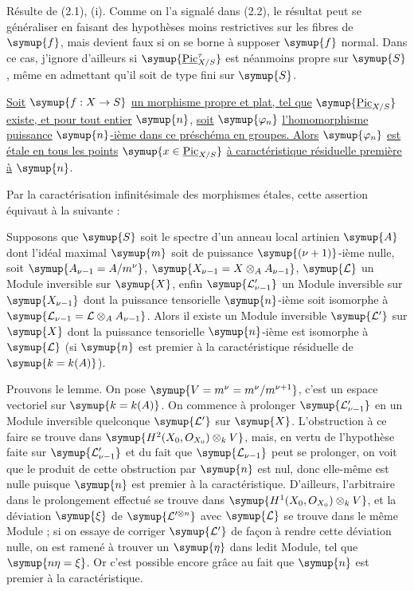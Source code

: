 Résulte de (2.1), (i). Comme on l'a signalé dans (2.2), le résultat peut se
généraliser en faisant des hypothèses moins restrictives sur les fibres de $\symup{f}$,
mais devient faux si on se borne à supposer $\symup{f}$ normal. Dans ce cas, j'ignore
d'ailleurs si $\symup{\underline{\operatorname{Pic}}_{X/S}^\tau}$ est néanmoins propre sur $\symup{S}$,
même en admettant qu'il soit de type fini sur $\symup{S}$.

 \uline{Soit} $\symup{f:X\to S}$ \uline{un morphisme propre et
plat, tel que} $\symup{\underline{\operatorname{Pic}}_{X/S}}$ \uline{existe, et pour tout entier} $\symup{n}$, \uline{soit}
$\symup{\varphi_n}$ \uline{l'homomorphisme puissance} $\symup{n}$\uline{-ième dans ce préschéma en groupes.
Alors} $\symup{\varphi_n}$ \uline{est étale en tous les points}
$\symup{x\in\underline{\operatorname{Pic}}_{X/S}}$ \uline{à
caractéristique résiduelle première à} $\symup{n}$.

Par la caractérisation infinitésimale des morphismes étales, cette assertion
équivaut à la suivante :

 Supposons que $\symup{S}$ soit le spectre d'un anneau local
artinien $\symup{A}$ dont l'idéal maximal $\symup{m}$ soit de puissance
$\symup{(\nu+1)}$-ième nulle, soit $\symup{A_{\nu-1}=A/m^\nu}$, $\symup{X_{\nu-1}=X\otimes_A A_{\nu-1}}$, $\symup{\mathcal L}$ un Module inversible sur $\symup{X}$, enfin $\symup{\mathcal L'_{\nu-1}}$ un
Module inversible sur $\symup{X_{\nu-1}}$ dont la puissance tensorielle $\symup{n}$-ième soit
isomorphe à $\symup{\mathcal L_{\nu-1}=\mathcal L\otimes_A A_{\nu-1}}$. Alors il existe un Module inversible $\symup{\mathcal L'}$ sur $\symup{X}$ dont la puissance
tensorielle $\symup{n}$-ième est isomorphe à $\symup{\mathcal L}$ (si $\symup{n}$ est premier à la
caractéristique résiduelle de $\symup{k=k(A)}$).

Prouvons le lemme. On pose $\symup{V=m^\nu=m^\nu/m^{\nu+1}}$, c'est un espace vectoriel sur $\symup{k=k(A)}$. On commence à prolonger
$\symup{\mathcal L'_{\nu-1}}$ en un Module inversible quelconque $\symup{\mathcal L'}$ sur $\symup{X}$.
L'obstruction à ce faire se trouve dans $\symup{H^2(X_0,O_{X_0})\otimes_k V}$, mais, en vertu de l'hypothèse faite sur $\symup{\mathcal L'_{\nu-1}}$ et du fait que
$\symup{\mathcal L_{\nu-1}}$ peut se prolonger, on voit que le produit de cette
obstruction par $\symup{n}$ est nul, donc elle-même est nulle puisque $\symup{n}$ est premier
à la caractéristique. D'ailleurs, l'arbitraire dans le prolongement effectué
se trouve dans $\symup{H^1(X_0,O_{X_0})\otimes_k V}$, et la déviation $\symup{\xi}$ de $\symup{\mathcal L'^{\otimes n}}$ avec $\symup{\mathcal L}$ se trouve
dans le même Module ; si on essaye de corriger $\symup{\mathcal L'}$ de façon à rendre
cette déviation nulle, on est ramené à trouver un $\symup{\eta}$ dans ledit Module,
tel que $\symup{n\eta=\xi}$. Or c'est possible encore grâce au fait que $\symup{n}$ est
premier à la caractéristique.

